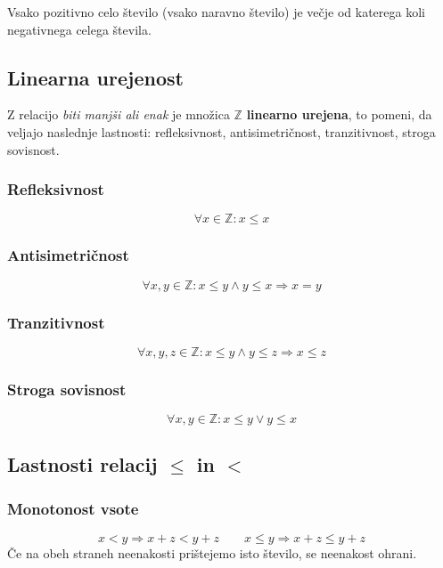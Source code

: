         Vsako pozitivno celo število (vsako naravno število) je večje od katerega koli negativnega celega števila.
    



    


        \subsection{Linearna urejenost}

    
        Z relacijo \textit{biti manjši ali enak} je množica $\mathbb{Z}$ \textbf{linearno urejena}, 
        to pomeni, da veljajo naslednje lastnosti: refleksivnost, antisimetričnost, tranzitivnost, stroga sovisnost.
    
    
        \subsubsection*{Refleksivnost}
        $$\forall x\in\mathbb{Z}: x\leq x$$
    

        \subsubsection*{Antisimetričnost}
        $$\forall x,y\in\mathbb{Z}: x\leq y \land y\leq x \Rightarrow x=y$$
    

        \subsubsection*{Tranzitivnost}
        $$\forall x,y,z\in\mathbb{Z}: x\leq y \land y\leq z \Rightarrow x\leq z$$
    

        \subsubsection*{Stroga sovisnost}
        $$\forall x,y\in\mathbb{Z}: x\leq y \lor y\leq x$$

    



        \subsection{Lastnosti relacij $\leq$ in $<$}
        \subsubsection*{Monotonost vsote}
        $$x<y \Rightarrow x+z<y+z \quad \quad x\leq y \Rightarrow x+z\leq y+z$$
        Če na obeh straneh neenakosti prištejemo isto število, se neenakost ohrani.
    \newline

